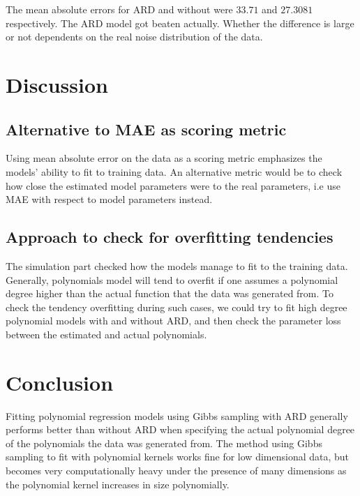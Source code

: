 \documentclass[12pt]{article}
\begin{document}
    The mean absolute errors for ARD and without were $33.71$ and $27.3081$ respectively. The ARD model got beaten actually. Whether the difference is large or not dependents on the real noise distribution of the data. 
        
    \section{Discussion}
        \subsection{Alternative to MAE as scoring metric}
        Using mean absolute error on the data as a scoring metric emphasizes the models' ability to fit to training data. An alternative metric would be to check how close the estimated model parameters were to the real parameters, i.e use MAE with respect to model parameters instead. 

        \subsection{Approach to check for overfitting tendencies}
        The simulation part checked how the models manage to fit to the training data. Generally, polynomials model will tend to overfit if one assumes a polynomial degree higher than the actual function that the data was generated from. To check the tendency overfitting during such cases, we could try to fit high degree polynomial models with and without ARD, and then check the parameter loss between the estimated and actual polynomials. 
    
    \section{Conclusion}
    Fitting polynomial regression models using Gibbs sampling with ARD generally performs better than without ARD when specifying the actual polynomial degree of the polynomials the data was generated from. The method using Gibbs sampling to fit with polynomial kernels works fine for low dimensional data, but becomes very computationally heavy under the presence of many dimensions as the polynomial kernel increases in size polynomially. 

    \appendix
\end{document}
